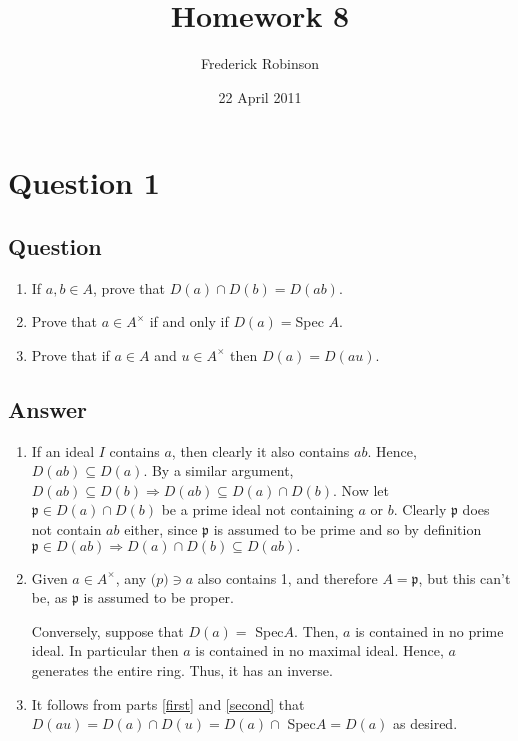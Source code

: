 \documentclass[11pt]{article}
\begin{document}



\title{Homework 8}
\author{Frederick Robinson}
\date{22 April 2011}
\maketitle




\section{Question 1}\label{q1}
\subsection{Question}
\begin{enumerate}
\item If $a, b \in A$, prove that $D(a) \cap D(b) = D(ab)$. 
\item Prove that $a \in A^\times $ if and only if $D(a) =$Spec $A$.
\item Prove that if $a \in A$ and $u \in A^\times$ then $D(a)= D(au)$.
\end{enumerate}
\subsection{Answer}
\begin{enumerate}
\item \label{first} If an ideal $I$ contains $a$, then clearly it also contains $ab$. Hence, $ D(ab) \subseteq D(a) $. By a similar argument, $D(ab) \subseteq D(b) \Rightarrow D(ab) \subseteq D(a) \cap D(b)$. Now let $\mathfrak{p} \in D(a) \cap D(b)$ be a prime ideal not containing $a$ or $b$.  Clearly $\mathfrak{p}$ does not contain $ab$ either, since $\mathfrak{p}$ is assumed to be prime and so by definition $\mathfrak{p} \in D(ab) \Rightarrow D(a) \cap D(b) \subseteq D(ab).$

\item \label{second} Given $a \in A^\times$, any $\mathfrak(p) \ni a$ also contains 1, and therefore $A = \mathfrak{p}$, but this can't be, as $\mathfrak{p}$ is assumed to be proper.

Conversely, suppose that $D(a) = $ Spec$A$. Then, $a$ is contained in no prime ideal. In particular then $a$ is contained in no maximal ideal. Hence, $a$ generates the entire ring. Thus, it has an inverse. 

\item It follows from parts \ref{first} and \ref{second} that $D(au) = D(a) \cap D(u) = D(a) \cap $ Spec$A = D(a)$ as desired.
\end{enumerate}
\end{document}
